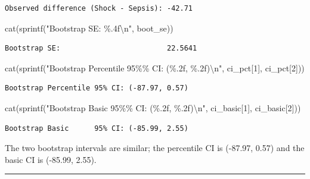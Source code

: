 \documentclass[
  letterpaper,
  DIV=11,
  numbers=noendperiod]{scrartcl}
\newenvironment{Shaded}{\begin{snugshade}}{\end{snugshade}}
\newcommand{\DecValTok}[1]{\textcolor[rgb]{0.68,0.00,0.00}{#1}}
\newcommand{\FunctionTok}[1]{\textcolor[rgb]{0.28,0.35,0.67}{#1}}
\newcommand{\NormalTok}[1]{\textcolor[rgb]{0.00,0.23,0.31}{#1}}
\newcommand{\SpecialCharTok}[1]{\textcolor[rgb]{0.37,0.37,0.37}{#1}}
\newcommand{\StringTok}[1]{\textcolor[rgb]{0.13,0.47,0.30}{#1}}
\begin{document}
\begin{verbatim}
Observed difference (Shock - Sepsis): -42.71
\end{verbatim}

\begin{Shaded}
\begin{Highlighting}[]
\FunctionTok{cat}\NormalTok{(}\FunctionTok{sprintf}\NormalTok{(}\StringTok{"Bootstrap SE:                         \%.4f}\SpecialCharTok{\textbackslash{}n}\StringTok{"}\NormalTok{, boot\_se))}
\end{Highlighting}
\end{Shaded}

\begin{verbatim}
Bootstrap SE:                         22.5641
\end{verbatim}

\begin{Shaded}
\begin{Highlighting}[]
\FunctionTok{cat}\NormalTok{(}\FunctionTok{sprintf}\NormalTok{(}\StringTok{"Bootstrap Percentile 95\%\% CI: (\%.2f, \%.2f)}\SpecialCharTok{\textbackslash{}n}\StringTok{"}\NormalTok{, ci\_pct[}\DecValTok{1}\NormalTok{],   ci\_pct[}\DecValTok{2}\NormalTok{]))}
\end{Highlighting}
\end{Shaded}

\begin{verbatim}
Bootstrap Percentile 95% CI: (-87.97, 0.57)
\end{verbatim}

\begin{Shaded}
\begin{Highlighting}[]
\FunctionTok{cat}\NormalTok{(}\FunctionTok{sprintf}\NormalTok{(}\StringTok{"Bootstrap Basic      95\%\% CI: (\%.2f, \%.2f)}\SpecialCharTok{\textbackslash{}n}\StringTok{"}\NormalTok{, ci\_basic[}\DecValTok{1}\NormalTok{], ci\_basic[}\DecValTok{2}\NormalTok{]))}
\end{Highlighting}
\end{Shaded}

\begin{verbatim}
Bootstrap Basic      95% CI: (-85.99, 2.55)
\end{verbatim}

The two bootstrap intervals are similar; the percentile CI is (-87.97,
0.57) and the basic CI is (-85.99, 2.55).

\begin{center}\rule{0.5\linewidth}{0.5pt}\end{center}
\end{document}
